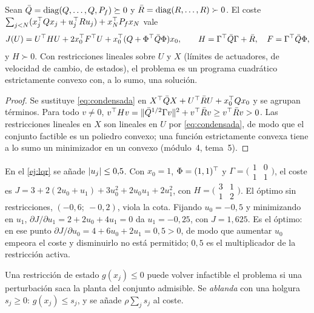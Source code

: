 \begin{proposicion}\label{prop:qp}
Sean $\bar Q=\operatorname{diag}(Q,\dots,Q,P_f)\succeq0$ y $\bar R=\operatorname{diag}(R,\dots,R)\succ0$. El coste $\sum_{j<N}(x_j^{\top} Qx_j+u_j^{\top} Ru_j)+x_N^{\top} P_fx_N$ vale
\[
J(U)=U^{\top} HU+2x_0^{\top} F^{\top} U+x_0^{\top}(Q+\Phi^{\top}\bar Q\Phi)x_0,\qquad H=\Gamma^{\top}\bar Q\Gamma+\bar R,\quad F=\Gamma^{\top}\bar Q\Phi,
\]
y $H\succ0$. Con restricciones lineales sobre $U$ y $X$ (límites de actuadores, de velocidad de cambio, de estados), el problema es un programa cuadrático estrictamente convexo con, a lo sumo, una solución.
\end{proposicion}

\begin{proof}
Se sustituye \eqref{eq:condensada} en $X^{\top}\bar QX+U^{\top}\bar RU+x_0^{\top} Qx_0$ y se agrupan términos. Para todo $v\ne0$, $v^{\top} Hv=\lVert\bar Q^{1/2}\Gamma v\rVert^{2}+v^{\top}\bar Rv\ge v^{\top}\bar Rv>0$. Las restricciones lineales en $X$ son lineales en $U$ por \eqref{eq:condensada}, de modo que el conjunto factible es un poliedro convexo; una función estrictamente convexa tiene a lo sumo un minimizador en un convexo (módulo~4, tema~5).
\end{proof}

\begin{ejemplo}\label{ej:mpc-qp}
En el \cref{ej:lqr} se añade $\lvert u_j\rvert\le0{,}5$. Con $x_0=1$, $\Phi=(1,1)^{\top}$ y $\Gamma=\bigl(\begin{smallmatrix}1&0\\1&1\end{smallmatrix}\bigr)$, el coste es $J=3+2(2u_0+u_1)+3u_0^{2}+2u_0u_1+2u_1^{2}$, con $H=\bigl(\begin{smallmatrix}3&1\\1&2\end{smallmatrix}\bigr)$. El óptimo sin restricciones, $(-0{,}6;\ -0{,}2)$, viola la cota. Fijando $u_0=-0{,}5$ y minimizando en $u_1$, $\partial J/\partial u_1=2+2u_0+4u_1=0$ da $u_1=-0{,}25$, con $J=1{,}625$. Es el óptimo: en ese punto $\partial J/\partial u_0=4+6u_0+2u_1=0{,}5>0$, de modo que aumentar $u_0$ empeora el coste y disminuirlo no está permitido; $0{,}5$ es el multiplicador de la restricción activa.
\end{ejemplo}

\begin{definicion}\label{def:blandas}
Una restricción de estado $g(x_j)\le0$ puede volver infactible el problema si una perturbación saca la planta del conjunto admisible. Se \emph{ablanda} con una holgura $s_j\ge0$: $g(x_j)\le s_j$, y se añade $\rho\sum_js_j$ al coste.
\end{definicion}

